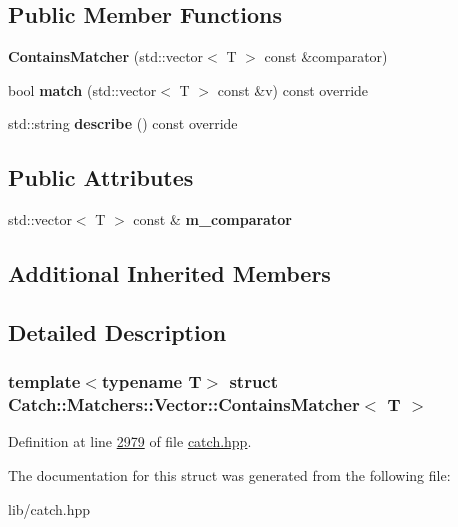 \subsection*{Public Member Functions}
\begin{DoxyCompactItemize}
\item 
\mbox{\label{structCatch_1_1Matchers_1_1Vector_1_1ContainsMatcher_ad8e92c8399be6dce75bb5702cdfab700}} 
{\bfseries Contains\+Matcher} (std\+::vector$<$ T $>$ const \&comparator)
\item 
\mbox{\label{structCatch_1_1Matchers_1_1Vector_1_1ContainsMatcher_afd33467ae48a41a634572b41b053f67f}} 
bool {\bfseries match} (std\+::vector$<$ T $>$ const \&v) const override
\item 
\mbox{\label{structCatch_1_1Matchers_1_1Vector_1_1ContainsMatcher_abe6a9ea3d6506c9a1f75ff524f35832e}} 
std\+::string {\bfseries describe} () const override
\end{DoxyCompactItemize}
\subsection*{Public Attributes}
\begin{DoxyCompactItemize}
\item 
\mbox{\label{structCatch_1_1Matchers_1_1Vector_1_1ContainsMatcher_a83d051166e4ed0d535219ad6ee99abb2}} 
std\+::vector$<$ T $>$ const  \& {\bfseries m\+\_\+comparator}
\end{DoxyCompactItemize}
\subsection*{Additional Inherited Members}


\subsection{Detailed Description}
\subsubsection*{template$<$typename T$>$\newline
struct Catch\+::\+Matchers\+::\+Vector\+::\+Contains\+Matcher$<$ T $>$}



Definition at line \mbox{\hyperlink{catch_8hpp_source_l02979}{2979}} of file \mbox{\hyperlink{catch_8hpp_source}{catch.\+hpp}}.



The documentation for this struct was generated from the following file\+:\begin{DoxyCompactItemize}
\item 
lib/catch.\+hpp\end{DoxyCompactItemize}
